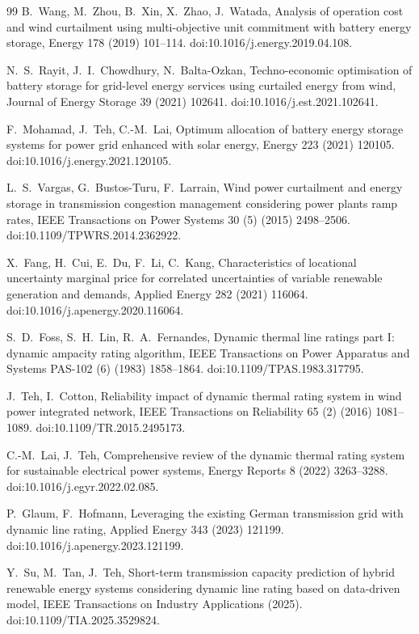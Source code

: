 \begin{thebibliography}{99}
B.~Wang, M.~Zhou, B.~Xin, X.~Zhao, J.~Watada,
Analysis of operation cost and wind curtailment using multi-objective unit commitment with battery energy storage,
Energy 178 (2019) 101--114.
doi:10.1016/j.energy.2019.04.108.

N.~S.~Rayit, J.~I.~Chowdhury, N.~Balta-Ozkan,
Techno-economic optimisation of battery storage for grid-level energy services using curtailed energy from wind,
Journal of Energy Storage 39 (2021) 102641.
doi:10.1016/j.est.2021.102641.

F.~Mohamad, J.~Teh, C.-M.~Lai,
Optimum allocation of battery energy storage systems for power grid enhanced with solar energy,
Energy 223 (2021) 120105.
doi:10.1016/j.energy.2021.120105.

L.~S.~Vargas, G.~Bustos-Turu, F.~Larrain,
Wind power curtailment and energy storage in transmission congestion management considering power plants ramp rates,
IEEE Transactions on Power Systems 30 (5) (2015) 2498--2506.
doi:10.1109/TPWRS.2014.2362922.

X.~Fang, H.~Cui, E.~Du, F.~Li, C.~Kang,
Characteristics of locational uncertainty marginal price for correlated uncertainties of variable renewable generation and demands,
Applied Energy 282 (2021) 116064.
doi:10.1016/j.apenergy.2020.116064.

S.~D.~Foss, S.~H.~Lin, R.~A.~Fernandes,
Dynamic thermal line ratings part I: dynamic ampacity rating algorithm,
IEEE Transactions on Power Apparatus and Systems PAS-102 (6) (1983) 1858--1864.
doi:10.1109/TPAS.1983.317795.

J.~Teh, I.~Cotton,
Reliability impact of dynamic thermal rating system in wind power integrated network,
IEEE Transactions on Reliability 65 (2) (2016) 1081--1089.
doi:10.1109/TR.2015.2495173.

C.-M.~Lai, J.~Teh,
Comprehensive review of the dynamic thermal rating system for sustainable electrical power systems,
Energy Reports 8 (2022) 3263--3288.
doi:10.1016/j.egyr.2022.02.085.

P.~Glaum, F.~Hofmann,
Leveraging the existing German transmission grid with dynamic line rating,
Applied Energy 343 (2023) 121199.
doi:10.1016/j.apenergy.2023.121199.

Y.~Su, M.~Tan, J.~Teh,
Short-term transmission capacity prediction of hybrid renewable energy systems considering dynamic line rating based on data-driven model,
IEEE Transactions on Industry Applications (2025).
doi:10.1109/TIA.2025.3529824.


\end{thebibliography}
